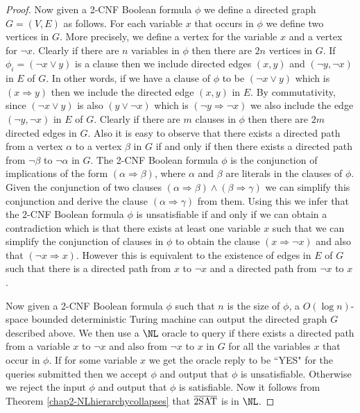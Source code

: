 \documentclass{amsbook}
\theoremstyle{definition}
\theoremstyle{remark}
\numberwithin{section}{chapter}
\numberwithin{equation}{chapter}
\begin{document}
\begin{proof}
Now given a 2-CNF Boolean formula $\phi$ we define a directed graph $G=(V,E)$ as follows. For each variable $x$ that occurs in $\phi$ we define two vertices in $G$. More precisely, we define a vertex for the variable $x$ and a vertex for $\neg x$. Clearly if there are $n$ variables in $\phi$ then there are $2n$ vertices in $G$. If $\phi _i=(\neg x\vee y)$ is a clause then we include directed edges $(x,y)$ and $(\neg y,\neg x)$ in $E$ of $G$. In other words, if we have a clause of $\phi$ to be $(\neg x\vee y)$ which is $(x\Rightarrow y)$ then we include the directed edge $(x,y)$ in $E$. By commutativity, since $(\neg x\vee y)$ is also $(y\vee \neg x)$ which is $(\neg y\Rightarrow\neg x)$ we also include the edge $(\neg y,\neg x)$ in $E$ of $G$. Clearly if there are $m$ clauses in $\phi$ then there are $2m$ directed edges in $G$. Also it is easy to observe that there exists a directed path from a vertex $\alpha$ to a vertex $\beta$ in $G$ if and only if then there exists a directed path from $\neg \beta$ to $\neg \alpha$ in $G$. The 2-CNF Boolean formula $\phi$ is the conjunction of implications of the form $(\alpha\Rightarrow\beta )$, where $\alpha$ and $\beta$ are literals in the clauses of $\phi$. Given the conjunction of two clauses $(\alpha\Rightarrow\beta )\wedge (\beta\Rightarrow\gamma )$ we can simplify this conjunction and derive the clause $(\alpha\Rightarrow\gamma )$ from them. Using this we infer that the 2-CNF Boolean formula $\phi$ is unsatisfiable if and only if we can obtain a contradiction which is that there exists at least one variable $x$ such that we can simplify the conjunction of clauses in $\phi$ to obtain the clause $(x\Rightarrow \neg x)$ and also that $(\neg x\Rightarrow x)$. However this is equivalent to the existence of edges in $E$ of $G$ such that there is a directed path from $x$ to $\neg x$ and a directed path from $\neg x$ to $x$.

Now given a 2-CNF Boolean formula $\phi$ such that $n$ is the size of $\phi$, a $O(\log n)$-space bounded deterministic Turing machine can output the directed graph $G$ described above. We then use a $\NL$ oracle to query if there exists a directed path from a variable $x$ to $\neg x$ and also from $\neg x$ to $x$ in $G$ for all the variables $x$ that occur in $\phi$. If for some variable $x$ we get the oracle reply to be ``YES" for the queries submitted then we accept $\phi$ and output that $\phi$ is unsatisfiable. Otherwise we reject the input $\phi$ and output that $\phi$ is satisfiable. Now it follows from Theorem \ref{chap2-NLhierarchycollapses} that $\overline{\rm 2SAT}$ is in $\NL$.
\end{proof}
\end{document}
